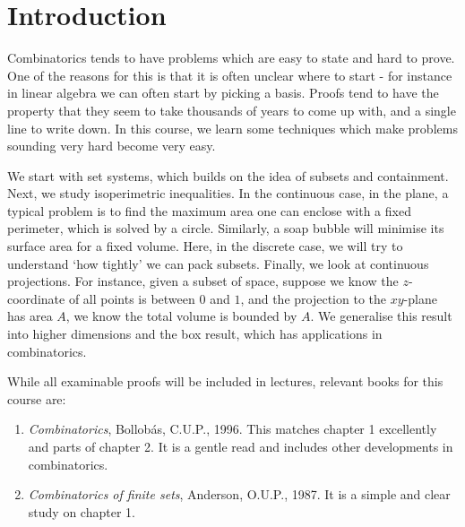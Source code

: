 \documentclass{article}
\begin{document}
\maketitle

\tableofcontents

\clearpage
\section{Introduction}
Combinatorics tends to have problems which are easy to state and hard to prove.
One of the reasons for this is that it is often unclear where to start - for instance in linear algebra we can often start by picking a basis.
Proofs tend to have the property that they seem to take thousands of years to come up with, and a single line to write down.
In this course, we learn some techniques which make problems sounding very hard become very easy.

We start with set systems, which builds on the idea of subsets and containment.
Next, we study isoperimetric inequalities.
In the continuous case, in the plane, a typical problem is to find the maximum area one can enclose with a fixed perimeter, which is solved by a circle.
Similarly, a soap bubble will minimise its surface area for a fixed volume.
Here, in the discrete case, we will try to understand `how tightly' we can pack subsets.
Finally, we look at continuous projections.
For instance, given a subset of space, suppose we know the $z$-coordinate of all points is between $0$ and $1$, and the projection to the $xy$-plane has area $A$, we know the total volume is bounded by $A$.
We generalise this result into higher dimensions and the box result, which has applications in combinatorics.

While all examinable proofs will be included in lectures, relevant books for this course are:
\begin{enumerate}
  \item \emph{Combinatorics}, Bollob\'{a}s, C.U.P., 1996. This matches chapter 1 excellently and parts of chapter 2. It is a gentle read and includes other developments in combinatorics.
  \item \emph{Combinatorics of finite sets}, Anderson, O.U.P., 1987. It is a simple and clear study on chapter 1.
\end{enumerate}

\clearpage
\end{document}
